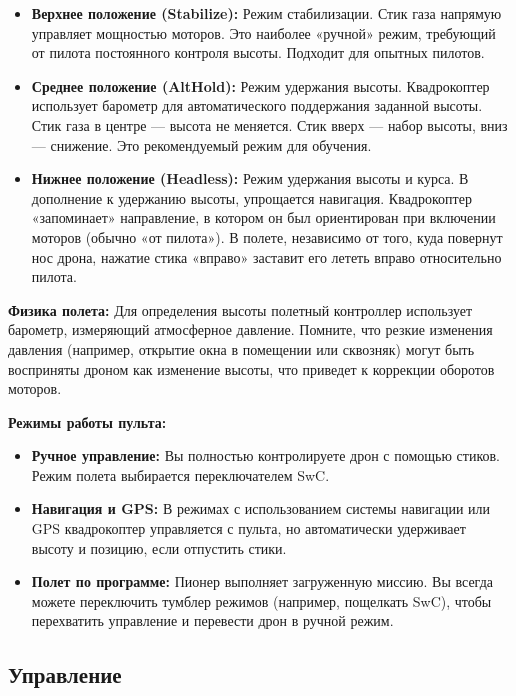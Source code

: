 \begin{itemize}
    \item \textbf{Верхнее положение (Stabilize):} Режим стабилизации. Стик газа напрямую управляет мощностью моторов. Это наиболее «ручной» режим, требующий от пилота постоянного контроля высоты. Подходит для опытных пилотов.
    \item \textbf{Среднее положение (AltHold):} Режим удержания высоты. Квадрокоптер использует барометр для автоматического поддержания заданной высоты. Стик газа в центре — высота не меняется. Стик вверх — набор высоты, вниз — снижение. Это рекомендуемый режим для обучения.
    \item \textbf{Нижнее положение (Headless):} Режим удержания высоты и курса. В дополнение к удержанию высоты, упрощается навигация. Квадрокоптер «запоминает» направление, в котором он был ориентирован при включении моторов (обычно «от пилота»). В полете, независимо от того, куда повернут нос дрона, нажатие стика «вправо» заставит его лететь вправо относительно пилота.
\end{itemize}

\begin{warnbox}
    \textbf{Физика полета:} Для определения высоты полетный контроллер использует барометр, измеряющий атмосферное давление. Помните, что резкие изменения давления (например, открытие окна в помещении или сквозняк) могут быть восприняты дроном как изменение высоты, что приведет к коррекции оборотов моторов.
\end{warnbox}

\textbf{Режимы работы пульта:}
\begin{itemize}
    \item \textbf{Ручное управление:} Вы полностью контролируете дрон с помощью стиков. Режим полета выбирается переключателем SwC.
    \item \textbf{Навигация и GPS:} В режимах с использованием системы навигации или GPS квадрокоптер управляется с пульта, но автоматически удерживает высоту и позицию, если отпустить стики.
    \item \textbf{Полет по программе:} Пионер выполняет загруженную миссию. Вы всегда можете переключить тумблер режимов (например, пощелкать SwC), чтобы перехватить управление и перевести дрон в ручной режим.
\end{itemize}

\subsection{Управление}

